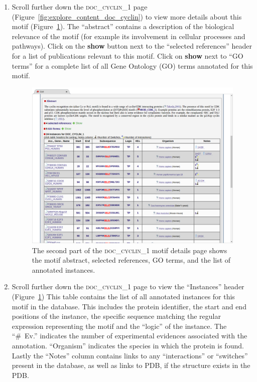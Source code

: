 \documentclass[12pt]{article}
\newcommand\button[1]{%
	\textbf{#1}%
}
\newcommand\motif[1]{%
    \textsc{\lowercase{#1}}%
}
\begin{document}
\begin{enumerate}
\item Scroll further down the \motif{DOC\_CYCLIN\_1} page
	(Figure~\ref{fig:explore_content_doc_cyclin}) to view
	more details about this motif
	(Figure~\ref{fig:explore_content_doc_cyclin_1_abstract_instances}).
    The ``abstract'' contains a description of the biological relevance of the
    motif (for example its involvement in cellular processes and pathways).
    Click on the \button{show} button next to the ``selected
	references'' header for a list of publications relevant to this motif.
	Click on \button{show} next to ``GO terms'' for a complete list of all
	Gene Ontology (GO) terms annotated for this motif.

\begin{figure}[h!]
	\centering
	\includegraphics[width=\textwidth]{Figures/explore_content/doc_cyclin_1_abstract_instances.png}
	\caption{
		The second part of the \motif{DOC\_CYCLIN\_1} motif details page
		shows the motif abstract, selected references, GO terms, and the list of annotated
		instances.
	}
	\label{fig:explore_content_doc_cyclin_1_abstract_instances}
\end{figure}

\item Scroll further down the \motif{DOC\_CYCLIN\_1} page to view
	the ``Instances'' header
	(Figure~\ref{fig:explore_content_doc_cyclin_1_abstract_instances})
	This table contains the list of all annotated
	instances for this motif in the database. This includes the protein
	identifier, the start and end positions of the instance, the specific
	sequence matching the regular expression representing the motif and
	the ``logic'' of the instance.
	The ``\#~Ev.'' indicates the number of experimental evidences
	associated with the annotation. ``Organism'' indicates the
	species in which the protein is found. Lastly the ``Notes'' column
	contains links to any ``interactions'' or ``switches'' present in the
	database, as well as links to PDB, if the structure exists in the PDB.
	

\end{enumerate}
\end{document}
